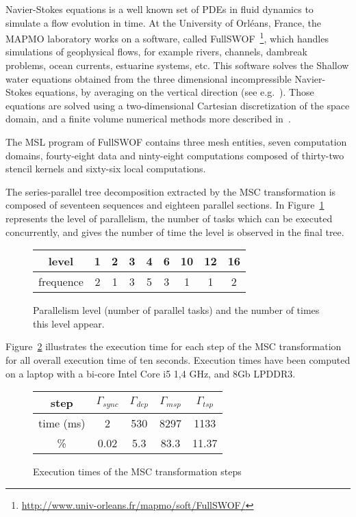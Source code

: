 Navier-Stokes equations is a well known set of PDEs in fluid dynamics to simulate a flow evolution in time. At the University of Orl\'eans, France, the MAPMO laboratory works on a software, called FullSWOF~\footnote{\url{http://www.univ-orleans.fr/mapmo/soft/FullSWOF/}}, which handles simulations of geophysical flows, for example rivers, channels, dambreak problems, ocean currents, estuarine systems, etc. This software solves the Shallow water equations obtained from the three dimensional incompressible Navier-Stokes equations, by averaging on the vertical direction (see e.g.~\cite{Ferrari2004}). Those equations are solved using a two-dimensional Cartesian discretization of the space domain, and a finite volume numerical methods more described in~\cite{HeleneLS13}.

The MSL program of FullSWOF contains three mesh entities, seven computation domains, fourty-eight data and ninty-eight computations composed of thirty-two stencil kernels and sixty-six local computations.

The series-parallel tree decomposition extracted by the MSC transformation is composed of seventeen sequences and eighteen parallel sections. In Figure~\ref{fig:freq} represents the level of parallelism, \ie the number of tasks which can be executed concurrently, and gives the number of time the level is observed in the final tree.

\begin{figure}[!h]
 \begin{center}
 \begin{tabular}{c|c|c|c|c|c|c|c|c|}
   level & 1 & 2 & 3 & 4 & 6 & 10 & 12 & 16\\
   \hline
   frequence & 2 & 1 & 3 & 5 & 3 & 1 & 1 & 2\\
 \end{tabular}
\caption{Parallelism level (number of parallel tasks) and the number of times this level appear.}
\label{fig:freq}
 \end{center}
\end{figure}

Figure~\ref{fig:exectime} illustrates the execution time for each step of the MSC transformation for all overall execution time of ten seconds. Execution times have been computed on a laptop with a bi-core Intel Core i5 1,4 GHz, and 8Gb LPDDR3. 

\begin{figure}[!h]
 \begin{center}
 \begin{tabular}{c|c|c|c|c|}
   step & $\Gamma_{sync}$ & $\Gamma_{dep}$ & $\Gamma_{msp}$ & $\Gamma_{tsp}$\\
   \hline
   time (ms) & 2 & 530 & 8297 & 1133\\
   \hline
   \% & 0.02 & 5.3 & 83.3 & 11.37\\
 \end{tabular}
\caption{Execution times of the MSC transformation steps}
\label{fig:exectime}
 \end{center}
\end{figure}

